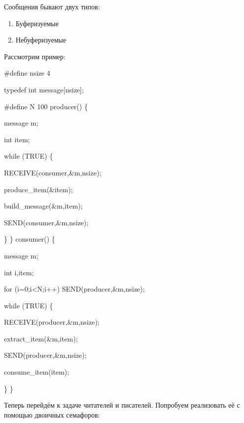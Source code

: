 \documentclass[a4paper,12pt]{article}
\begin{document}
	Сообщения бывают двух типов:
	\begin{enumerate}
		\item Буферизуемые
		\item Небуферизуемые
	\end{enumerate}
	
	Рассмотрим пример:
	
	{\bf {\#define nsize 4
	
		typedef int message[nsize];
		
		\#define N 100
	\newline
	\newline
	producer() \{
	
		message m;
		
		int item;
		
		while (TRUE) \{
		
			\qquad RECEIVE(consumer,\&m,nsize);
			
			\qquad produce\_item(\&item);
			
			\qquad build\_message(\&m,item);
			
			\qquad SEND(consumer,\&m,nsize);
			
		\}
	\newline
	\}
	\newline
	consumer() \{
	
		message m;
		
		int i,item;
		
		for (i=0;i<N;i++) SEND(producer,\&m,nsize);
		
		while (TRUE) \{
		
			\qquad RECEIVE(producer,\&m,nsize);
			
			\qquad extract\_item(\&m,item);
			
			\qquad SEND(producer,\&m,nsize);
			
			\qquad consume\_item(item);
			
		\}
	\newline
	\} }}
	
	Теперь перейдём к задаче читателей и писателей. Попробуем реализовать её с помощью
двоичных семафоров:
\end{document}
